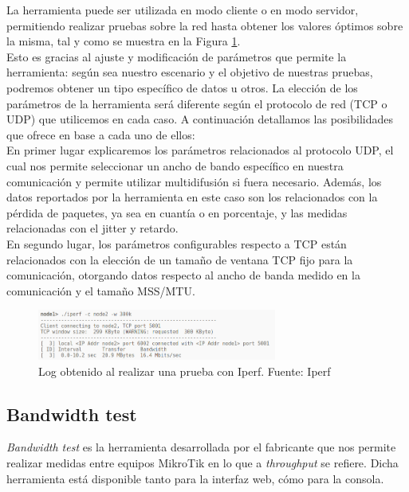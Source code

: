 La herramienta puede ser utilizada en modo cliente o en modo servidor, permitiendo realizar pruebas sobre la red hasta obtener los valores óptimos sobre la misma, tal y como se muestra en la Figura \ref{logTestIperf}.\\

Esto es gracias al ajuste y modificación de parámetros que permite la herramienta: según sea nuestro escenario y el objetivo de nuestras pruebas, podremos obtener un tipo específico de datos u otros. La elección de los parámetros de la herramienta será diferente según el protocolo de red (TCP o UDP) que utilicemos en cada caso. A continuación detallamos las posibilidades que ofrece en base a cada uno de ellos:\\

En primer lugar explicaremos los parámetros relacionados al protocolo UDP, el cual nos permite seleccionar un ancho de bando específico en nuestra comunicación y permite utilizar multidifusión si fuera necesario. Además, los datos reportados por la herramienta en este caso son los relacionados con la pérdida de paquetes, ya sea en cuantía o en porcentaje, y las medidas relacionadas con el jitter y retardo.\\

En segundo lugar, los parámetros configurables respecto a TCP están relacionados con la elección de un tamaño de ventana TCP fijo para la comunicación, otorgando datos respecto al ancho de banda medido en la comunicación y el tamaño MSS/MTU.

\begin{figure}[H]
	\centering
	\includegraphics[width=0.7\textwidth]{img/log_iperf.png}
	\caption{Log obtenido al realizar una prueba con Iperf. Fuente: Iperf}
	\label{logTestIperf}
\end{figure}

\subsection{Bandwidth test}
\textit{Bandwidth test} es la herramienta desarrollada por el fabricante que nos permite realizar medidas entre equipos MikroTik en lo que a \textit{throughput} se refiere. Dicha herramienta está disponible tanto para la interfaz web, cómo para la consola.\\

